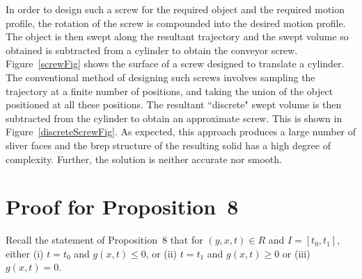\documentclass{elsart5p}
\begin{document}
In order to design such a screw for the required object and the required motion profile, 
the rotation of the screw is compounded into the desired motion profile.  The object is then 
swept along the resultant trajectory and the swept volume so obtained is subtracted from a cylinder to 
obtain the conveyor screw.  Figure~\ref{screwFig} shows the surface of a screw designed 
to translate a cylinder.  The conventional method of designing such screws involves sampling 
the trajectory at a finite number of positions, and taking the union of the object positioned at all these 
positions.  The resultant ``discrete" swept volume is then subtracted from the cylinder to obtain 
an approximate screw.  This is shown in Figure~\ref{discreteScrewFig}.  As expected, this approach 
produces a large number of sliver faces and the brep structure of the resulting solid has a high degree 
of complexity.  Further, the solution is neither accurate nor smooth.


\section{Proof for Proposition~8}	\label{gProofSec}
Recall the statement of Proposition~8 that for $(y, x, t) \in R$ and $I = [t_0, t_1]$, 
either (i) $t = t_0$ and $g(x,t) \leq 0$, or 
(ii) $t = t_1$ and $g(x,t) \geq 0$ or (iii) $g(x,t) = 0$.
\end{document}
